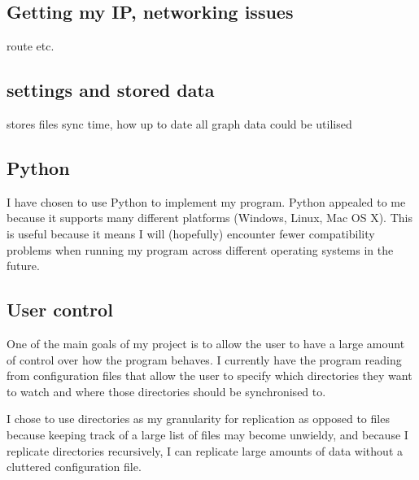 \documentclass[12pt]{article}
\begin{document}

\subsection{Getting my IP, networking issues}
route etc.

\subsection{settings and stored data}
stores files sync time, how up to date
all graph data could be utilised

\subsection{Python}
I have chosen to use Python to implement
my program. Python appealed to me because it
supports many different platforms (Windows, Linux, Mac OS X).
This is useful because it means I will (hopefully)
encounter fewer compatibility problems when running
my program across different operating systems in the future.


\subsection{User control}
One of the main goals of my project is to allow the user
to have a  large amount of control over how the program
behaves. I currently have the program reading from
configuration files that allow the user to specify
which directories they want to watch and where those
directories should be synchronised to.

I chose to use directories as my granularity for replication
as opposed to files because keeping track of a large list
of files may become unwieldy,
and because I replicate
directories recursively, I can replicate large amounts
of data without a cluttered configuration file.
\end{document}
